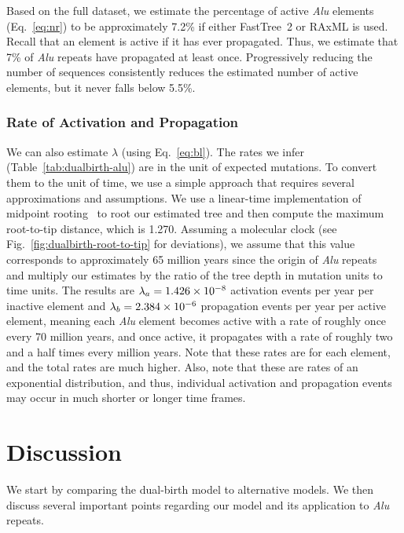 Based on the full dataset, we estimate the percentage of active \textit{Alu} elements (Eq.~\ref{eq:nr}) to be approximately 7.2\% if either FastTree~2 or RAxML is used. Recall that an element is active if it has ever propagated. Thus, we estimate that 7\% of \textit{Alu} repeats have propagated at least once. Progressively reducing the number of sequences consistently reduces the estimated number of active elements, but it never falls below 5.5\%.

\subsubsection{Rate of Activation and Propagation}
We can also estimate $\lambda$ (using Eq.~\ref{eq:bl}). The rates we infer (Table~\ref{tab:dualbirth-alu}) are in the unit of expected mutations. To convert them to the unit of time, we use a simple approach that requires several approximations and assumptions. We use a linear-time implementation of midpoint rooting~\cite{Mai2017} to root our estimated tree and then compute the maximum root-to-tip distance, which is 1.270. Assuming a molecular clock (see Fig.~\ref{fig:dualbirth-root-to-tip} for deviations), we assume that this value corresponds to approximately 65 million years since the origin of \textit{Alu} repeats~\cite{Batzer2002} and multiply our estimates by the ratio of the tree depth in mutation units to time units. The results are $\lambda_a=1.426\times10^{-8}$ activation events per year per inactive element and $\lambda_b=2.384\times10^{-6}$ propagation events per year per active element, meaning each \textit{Alu} element becomes active with a rate of roughly once every 70 million years, and once active, it propagates with a rate of roughly two and a half times every million years. Note that these rates are for each element, and the total rates are much higher. Also, note that these are rates of an exponential distribution, and thus, individual activation and propagation events may occur in much shorter or longer time frames.

\section{Discussion}
We start by comparing the dual-birth model to alternative models. We then discuss several important points regarding our model and its application to \textit{Alu} repeats. 

